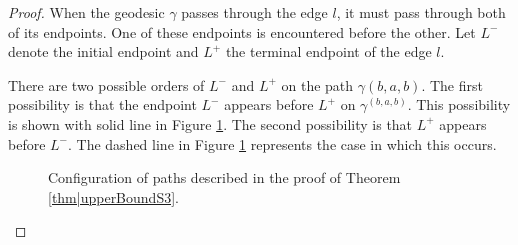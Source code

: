 \documentclass[reqno]{amsart}
\begin{document}
\begin{proof}
When the geodesic  $\gamma$ passes through the edge  $l$, it must pass through both of its endpoints. One of these endpoints is encountered before the other. Let $L^-$ denote the initial endpoint and $L^+$ the terminal endpoint of the edge $l$.

 
There are two possible orders of $L^-$ and $L^+$ on the path $\gamma(b,a,b)$. The first possibility is that the endpoint $L^-$ appears before $L^+$ on $\gamma^{(b,a,b)}$. This possibility is shown with solid line in Figure \ref{fig|worstCaseUpperBound3}. The second possibility is that $L^+$ appears before $L^-$. The dashed line in Figure \ref{fig|worstCaseUpperBound3} represents the case in which this occurs. 



 \begin{figure}[t]
 \centering
{}
\caption{Configuration of paths described in the proof of Theorem \ref{thm|upperBoundS3}.}
\label{fig|worstCaseUpperBound3}
\end{figure}



\end{proof}
\end{document}

